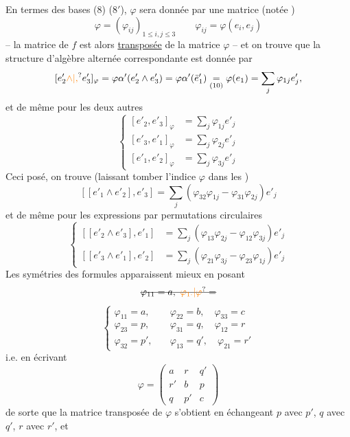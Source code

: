 En termes des bases (8) (8$'$), $\varphi$ sera donnée par une matrice (notée )
\[
 \varphi=(\varphi_{ij})_{1\leq i,j\leq3}\qquad \varphi_{ij}=\varphi(e_i,e_j) \tag*{(11)}
\]
-- la matrice de $f$ est alors \uline{transposée} de la matrice $\varphi$ -- et on trouve que la structure d'algèbre alternée correspondante est donnée par
\[
 [e'_2\unsure{\wedge|,}e'_3]_\varphi=\varphi\alpha'(e'_2\wedge e'_3)=\varphi\alpha'(\bar e'_1)
 \underset{(10)}{=}\varphi(e_1)=\sum_j\varphi_{1j}e'_j,
\]
et de \deleted{$[e'_3\wedge e'_1]=$} même pour les deux autres 
\[
\left\{\begin{aligned}
 [e'_2,e'_3]_\varphi&=\sum_j\varphi_{1j}e'_j\\
 [e'_3,e'_1]_\varphi&=\sum_j\varphi_{2j}e'_j\\
 [e'_1,e'_2]_\varphi&=\sum_j\varphi_{3j}e'_j
\end{aligned}\right. \tag*{(12)}
\]
Ceci posé, on trouve (laissant tomber l'indice $\varphi$ dans les )
\[
 [[e'_1\wedge e'_2],e'_3]=\sum_j(\varphi_{32}\varphi_{1j}-\varphi_{31}\varphi_{2j})e'_j \tag*{(13)}
\]
et de même pour les expressions  par permutations circulaires
\[
\left\{\begin{aligned}
 [[e'_2\wedge e'_3],e'_1]&=\sum_j(\varphi_{13}\varphi_{2j}-\varphi_{12}\varphi_{3j})e'_j\\
 [[e'_3\wedge e'_1],e'_2]&=\sum_j(\varphi_{21}\varphi_{3j}-\varphi_{23}\varphi_{1j})e'_j
\end{aligned}\right. \tag*{(13 bis)}
\]
Les  symétries des formules apparaissent mieux en posant
\[
 \deleted{\varphi_{11}=a,\ \unsure{\varphi_{1\cdot}|\varphi}=}
\]
\[
\left\{\begin{aligned}
 \varphi_{11}=a,\quad &\varphi_{22}=b,\quad \varphi_{33}=c\\
 \varphi_{23}=p,\quad &\varphi_{31}=q,\quad \varphi_{12}=r\\
 \varphi_{32}=p',\quad &\varphi_{13}=q',\quad \varphi_{21}=r'
\end{aligned}\right. \tag*{(14)}
\]
i.e. en écrivant
\[
 \varphi=\begin{pmatrix}a&r&q'\\ r'&b&p\\ q&p'&c\end{pmatrix} \tag*{(15)}
\]
de sorte que la matrice transposée de $\varphi$ s'obtient en échangeant $p$ avec $p'$, $q$ avec $q'$, $r$ avec $r'$, et

